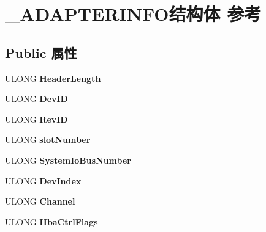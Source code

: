 \hypertarget{struct___a_d_a_p_t_e_r_i_n_f_o}{}\section{\+\_\+\+A\+D\+A\+P\+T\+E\+R\+I\+N\+F\+O结构体 参考}
\label{struct___a_d_a_p_t_e_r_i_n_f_o}
\subsection*{Public 属性}
\begin{DoxyCompactItemize}
\item 
\mbox{\label{struct___a_d_a_p_t_e_r_i_n_f_o_af5d41042d091b77de0c1ba1a44b713f4}} 
U\+L\+O\+NG {\bfseries Header\+Length}
\item 
\mbox{\label{struct___a_d_a_p_t_e_r_i_n_f_o_a12b94836f79146f1ebd571dd4c05bf67}} 
U\+L\+O\+NG {\bfseries Dev\+ID}
\item 
\mbox{\label{struct___a_d_a_p_t_e_r_i_n_f_o_a47cf679e040a40f0f7e1f6157f133b0a}} 
U\+L\+O\+NG {\bfseries Rev\+ID}
\item 
\mbox{\label{struct___a_d_a_p_t_e_r_i_n_f_o_ac0d0bdcf4f8e36bf13b030776425b897}} 
U\+L\+O\+NG {\bfseries slot\+Number}
\item 
\mbox{\label{struct___a_d_a_p_t_e_r_i_n_f_o_ae18e0f080b095f19d2e2fd6feda08bb8}} 
U\+L\+O\+NG {\bfseries System\+Io\+Bus\+Number}
\item 
\mbox{\label{struct___a_d_a_p_t_e_r_i_n_f_o_aa8b5eeb5091984ff6fdf15725bb13ffb}} 
U\+L\+O\+NG {\bfseries Dev\+Index}
\item 
\mbox{\label{struct___a_d_a_p_t_e_r_i_n_f_o_a0ce9877d78a540aa450b351f77f07b19}} 
U\+L\+O\+NG {\bfseries Channel}
\item 
\mbox{\label{struct___a_d_a_p_t_e_r_i_n_f_o_aaa2ad6f1c6164d24df2db6b5f70ca413}} 
U\+L\+O\+NG {\bfseries Hba\+Ctrl\+Flags}
\item 

\end{DoxyCompactItemize}

